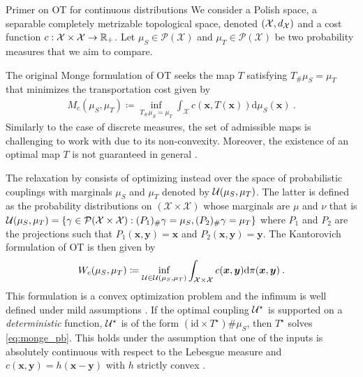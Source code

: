 \begin{mem1}{Primer on OT for continuous distributions}
    We consider a Polish space, \ie a separable completely metrizable topological space, denoted $(\mathcal{X}, d_{{\mathcal{X}}})$ and a cost function $c : \mathcal{X} \times \mathcal{X} \to \mathbb{R}_+$. Let $\mu_S \in \mathcal{P}(\mathcal{X})$ and $\mu_T \in \mathcal{P}(\mathcal{X})$ be two probability measures that we aim to compare.

    The original Monge formulation \citep{monge1781memoire} of OT seeks the map $T$ satisfying $T_{\#}\mu_S = \mu_T$ that minimizes the transportation cost given by
    \begin{align}\label{eq:monge_pb_continuous}
        M_c(\mu_S, \mu_T) \coloneqq \inf_{T_{\#}\mu_S = \mu_T} \int_{\mathcal{X}} c(\bm{x}, T(\bm{x})) \mathrm{d}\mu_S(\bm{x}) \:.
    \end{align}
    Similarly to the case of discrete measures, the set of admissible maps is challenging to work with due to its non-convexity. Moreover, the existence of an optimal map \(T\) is not guaranteed in general \citep{santambrogio2015optimal}.

    The relaxation by \cite{kantorovich1942translocation} consists of optimizing instead over the space of probabilistic couplings with marginals $\mu_S$ and $\mu_T$ denoted by ${\mathcal{U}}(\mu_S, \mu_T)$. The latter is defined as the probability distributions on $(\mathcal{X} \times \mathcal{X})$ whose marginals are $\mu$ and $\nu$ that is ${\mathcal{U}}(\mu_S, \mu_T) = \left\{ \gamma \in \mathcal{P}(\mathcal{X} \times \mathcal{X}) : (P_{1})_\# \gamma = \mu_S, (P_{2})_\# \gamma = \mu_T \right\}$ where $P_{1}$ and $P_{2}$ are the projections such that $P_{1}(\bm{x}, \bm{y}) = \bm{x}$ and $P_{2}(\bm{x}, \bm{y}) = \bm{y}$.
    The Kantorovich formulation of OT is then given by
    \begin{align}\label{eq:Wasserstein}
        W_c(\mu_S, \mu_T) \coloneqq \inf_{{\mathcal{U}} \in {\mathcal{U}}(\mu_S, \mu_T)} \int_{\mathcal{X} \times \mathcal{X}} c(\bm{x}, \bm{y}) \mathrm{d}\pi(\bm{x}, \bm{y}) \:.
    \end{align}
    This formulation is a convex optimization problem and the infimum is well
    defined under mild assumptions \citep{santambrogio2015optimal}. If the optimal
    coupling ${\mathcal{U}}^\star$ is supported on a \emph{deterministic} function, \ie
    ${\mathcal{U}}^\star$ is of the form $(\mathrm{id} \times T^\star)\# \mu_S$, then
    $T^\star$ solves \eqref{eq:monge_pb}. This holds under the assumption that one
    of the inputs is absolutely continuous with respect to the Lebesgue measure
    and $c(\bm{x}, \bm{y}) = h(\bm{x} - \bm{y})$ with
    $h$ strictly convex \citep{gangbo1996geometry}.
    
    \end{mem1}

